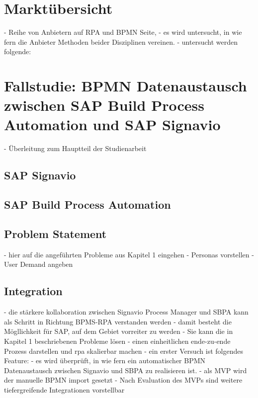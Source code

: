 \chapter{Marktübersicht}

- Reihe von Anbietern auf RPA und BPMN Seite,
- es wird untersucht, in wie fern die Anbieter Methoden beider Disziplinen vereinen.
- untersucht werden folgende:
\chapter{Fallstudie: BPMN Datenaustausch zwischen SAP Build Process Automation und SAP Signavio}

    - Überleitung zum Hauptteil der Studienarbeit
\section{SAP Signavio}
\section{SAP Build Process Automation}

\section{Problem Statement}
    - hier auf die angeführten Probleme aus Kapitel 1 eingehen
    - Personas vorstellen
    - User Demand angeben


   \section{Integration}
   - die stärkere kollaboration zwischen Signavio Process Manager und SBPA kann als Schritt in Richtung BPMS-RPA verstanden werden
   - damit besteht die Mögllichkeit für SAP, auf dem Gebiet vorreiter zu werden
   - Sie kann die in Kapitel 1 beschriebenen Probleme lösen
   - einen einheitlichen ende-zu-ende Prozess darstellen und rpa skalierbar machen
   - ein erster Versuch ist folgendes Feature:
   - es wird überprüft, in wie fern ein automatischer BPMN Datenaustausch zwischen Signavio und SBPA zu realisieren ist.
   - als MVP wird der manuelle BPMN import gesetzt
   - Nach Evaluation des MVPs sind weitere tiefergreifende Integrationen vorstellbar

